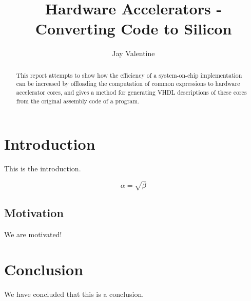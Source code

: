\documentclass{report}
\begin{document}
\title{Hardware Accelerators - Converting Code to Silicon}
\author{Jay Valentine}

\maketitle

\begin{abstract}
This report attempts to show how the efficiency of a system-on-chip implementation can be increased by offloading
the computation of common expressions to hardware accelerator cores, and gives a method for generating VHDL descriptions
of these cores from the original assembly code of a program.
\end{abstract}

\section{Introduction}
This is the introduction.

\begin{equation}
    \label{simple_equation}
    \alpha = \sqrt{ \beta }
\end{equation}

\subsection{Motivation}
We are motivated!

\section{Conclusion}
We have concluded that this is a conclusion.
\end{document}
